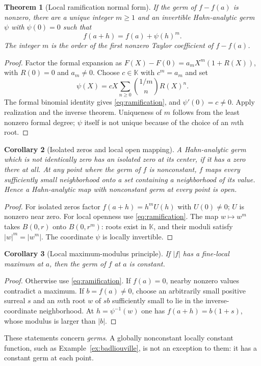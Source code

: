 \documentclass[11pt,a4paper]{article}
\newtheorem{theorem}{Theorem}[section]
\newtheorem{corollary}[theorem]{Corollary}
\theoremstyle{definition}\newtheorem{definition}[theorem]{Definition}
\theoremstyle{remark}\newtheorem{remark}[theorem]{Remark}
\newcommand{\K}{\mathbb K}
\numberwithin{equation}{section}
\begin{document}
\begin{theorem}[Local ramification normal form]\label{thm:normalform}
If the germ of $f-f(a)$ is nonzero, there are a unique integer $m\geq1$ and an invertible Hahn-analytic germ $\psi$ with $\psi(0)=0$ such that
\begin{equation}\label{eq:ramification}
 f(a+h)=f(a)+\psi(h)^m.
\end{equation}
The integer $m$ is the order of the first nonzero Taylor coefficient of $f-f(a)$.
\end{theorem}
\begin{proof}
Factor the formal expansion as
$F(X)-F(0)=a_mX^m(1+R(X))$, with $R(0)=0$ and $a_m\ne0$. Choose $c\in\K$ with $c^m=a_m$ and set
\[
 \psi(X)=cX\sum_{n\geq0}\binom{1/m}{n}R(X)^n.
\]
The formal binomial identity gives \eqref{eq:ramification}, and $\psi'(0)=c\ne0$. Apply realization and the inverse theorem. Uniqueness of $m$ follows from the least nonzero formal degree; $\psi$ itself is not unique because of the choice of an $m$th root.
\end{proof}

\begin{corollary}[Isolated zeros and local open mapping]\label{cor:localmapping}
A Hahn-analytic germ which is not identically zero has an isolated zero at its center, if it has a zero there at all. At any point where the germ of $f$ is nonconstant, $f$ maps every sufficiently small neighborhood onto a set containing a neighborhood of its value. Hence a Hahn-analytic map with nonconstant germ at every point is open.
\end{corollary}
\begin{proof}
For isolated zeros factor $f(a+h)=h^mU(h)$ with $U(0)\ne0$; $U$ is nonzero near zero. For local openness use \eqref{eq:ramification}. The map $w\mapsto w^m$ takes $B(0,r)$ onto $B(0,r^m)$: roots exist in $\K$, and their moduli satisfy $|w|^m=|w^m|$. The coordinate $\psi$ is locally invertible.
\end{proof}

\begin{corollary}[Local maximum-modulus principle]\label{cor:localmaximum}
If $|f|$ has a fine-local maximum at $a$, then the germ of $f$ at $a$ is constant.
\end{corollary}
\begin{proof}
Otherwise use \eqref{eq:ramification}. If $f(a)=0$, nearby nonzero values contradict a maximum. If $b=f(a)\ne0$, choose an arbitrarily small positive surreal $s$ and an $m$th root $w$ of $sb$ sufficiently small to lie in the inverse-coordinate neighborhood. At $h=\psi^{-1}(w)$ one has $f(a+h)=b(1+s)$, whose modulus is larger than $|b|$.
\end{proof}
These statements concern \emph{germs}. A globally nonconstant locally constant function, such as Example~\ref{ex:badliouville}, is not an exception to them: it has a constant germ at each point.
\end{document}
